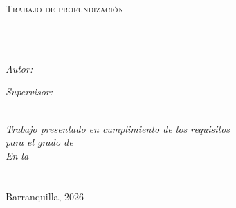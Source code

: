 \documentclass[
11pt,
english, %
openany, %
singlespacing,
headsepline,
]{MastersDoctoralThesis}
\author{Miguel \textsc{Herrera}}
\begin{document}
\setlength{\headheight}{14.5pt}
\frontmatter
\pagestyle{plain}

\begin{titlepage}
\begin{center}
\vspace*{.06\textheight}
{\scshape\LARGE \univname\par}\vspace{1.5cm}
\textsc{\Large Trabajo de profundización}\\[0.5cm]
\HRule \\[0.4cm]
{\huge \bfseries \ttitle\par}\vspace{0.4cm}
\HRule \\[1.5cm]
\begin{minipage}[t]{0.4\textwidth}
\begin{flushleft} \large
\emph{Autor:}\\
\href{https://www.linkedin.com/in/miguel-herrera-rocha-87075411b}{\authorname}
\end{flushleft}
\end{minipage}
\begin{minipage}[t]{0.4\textwidth}
\begin{flushright} \large
\emph{Supervisor:} \\
\supname
\end{flushright}
\end{minipage}\\[3cm]
\vfill
\large \textit{Trabajo presentado en cumplimiento de los requisitos \\ para el grado de \degreename}\\[0.3cm]
\textit{En la}\\[0.4cm]
\groupname\\\deptname\\[2cm]
\vfill
{\large Barranquilla, 2026}\\[4cm]
\vfill
\end{center}
\end{titlepage}


\end{document}
